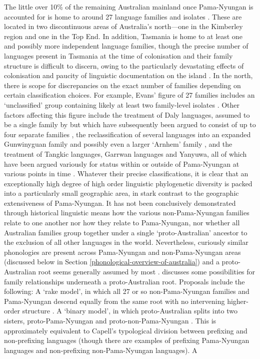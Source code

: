 The little over 10\% of the remaining Australian mainland once Pama-Nyungan is accounted for is home to around 27 language families and isolates \autocite{evans_non-pama-nyungan_2003}. These are located in two discontinuous areas of Australia's north---one in the Kimberley region and one in the Top End. In addition, Tasmania is home to at least one and possibly more independent language families, though the precise number of languages present in Tasmania at the time of colonisation and their family structure is difficult to discern, owing to the particularly devastating effects of colonisation and paucity of linguistic documentation on the island \autocite{bowern_riddle_2012}. In the north, there is scope for discrepancies on the exact number of families depending on certain classification choices. For example, Evans' figure of 27 families includes an `unclassified' group containing likely at least two family-level isolates \autocite[p.~11]{evans_non-pama-nyungan_2003}. Other factors affecting this figure include the treatment of Daly languages, assumed to be a single family by \textcite{tryon_daly_1974} but which have subsequently been argued to consist of up to four separate families \autocite[ch.~4--7]{evans_non-pama-nyungan_2003}, the reclassification of several languages into an expanded Gunwinyguan family and possibly even a larger `Arnhem' family \autocite[p.~14--15]{evans_non-pama-nyungan_2003}, and the treatment of Tangkic languages, Garrwan languages and Yanyuwa, all of which have been argued variously for status within or outside of Pama-Nyungan at various points in time \autocite[p.~12]{evans_non-pama-nyungan_2003}. Whatever their precise classifications, it is clear that an exceptionally high degree of high order linguistic phylogenetic diversity is packed into a particularly small geographic area, in stark contrast to the geographic extensiveness of Pama-Nyungan. It has not been conclusively demonstrated through historical linguistic means how the various non-Pama-Nyungan families relate to one another nor how they relate to Pama-Nyungan, nor whether all Australian families group together under a single `proto-Australian' ancestor to the exclusion of all other languages in the world. Nevertheless, curiously similar phonologies are present across Pama-Nyungan and non-Pama-Nyungan areas (discussed below in Section \ref{phonological-overview-of-australia}) and a proto-Australian root \autocite[e.g.~as proposed by][]{dixon_languages_1980} seems generally assumed by most \autocite[e.g.][]{hamilton_phonetic_1996}. \textcite{evans_non-pama-nyungan_2003} discusses some possibilities for family relationships underneath a proto-Australian root. Proposals include the following: A `rake model', in which all 27 or so non-Pama-Nyungan families and Pama-Nyungan descend equally from the same root with no intervening higher-order structure \autocite{ogrady_languages_1966}. A `binary model', in which proto-Australian splits into two sisters, proto-Pama-Nyungan and proto-non-Pama-Nyungan \autocite{heath_linguistic_1978}. This is approximately equivalent to Capell's \autocite*{capell_new_1956} typological division between prefixing and non-prefixing languages (though there are examples of prefixing Pama-Nyungan languages and non-prefixing non-Pama-Nyungan languages). A 